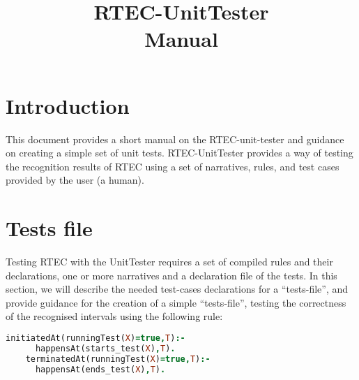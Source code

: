 \documentclass[a4paper,10pt]{article}
\title{RTEC-UnitTester\\Manual}
\author{}
\date{}
\begin{document}
\maketitle
\section{Introduction}
This document provides a short manual on the RTEC-unit-tester and guidance on creating a simple set of unit tests. RTEC-UnitTester provides a way of testing the recognition results of RTEC using a set of narratives, rules, and test cases provided by the user (a human).
\section{Tests file}
Testing RTEC with the UnitTester requires a set of compiled rules and their declarations, one or more narratives and a declaration file of the tests.
In this section, we will describe the needed test-cases declarations for a ``tests-file'', and provide guidance for the creation of a simple ``tests-file'', testing the correctness
of the recognised intervals using the following rule:
\begin{lstlisting}[language=Prolog]
    initiatedAt(runningTest(X)=true,T):-
      happensAt(starts_test(X),T).
    terminatedAt(runningTest(X)=true,T):-
      happensAt(ends_test(X),T).
\end{lstlisting}
\end{document}
